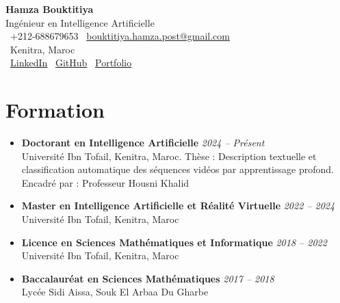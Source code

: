 \documentclass[10pt,a4paper]{article}
\newcommand{\cvheader}[4]{
    \begin{center}
        {\Huge\bfseries #1}\\[0.1em]
        {\large #2}\\[0.2em]
        \faPhone\ #3 \quad \faEnvelope\ \href{mailto:#4}{#4}\\[0.1em]
        \faMapMarker\ Kenitra, Maroc\\[0.1em]
        \faLinkedin\ \href{https://www.linkedin.com/in/hamza-bouktitiya-604471253/}{LinkedIn} \quad
        \faGithub\ \href{https://github.com/gothamza}{GitHub} \quad
        \faGlobe\ \href{https://gothamza.github.io/portfolio/}{Portfolio}
    \end{center}
    \vspace{-0.3em}
}
\newcommand{\cvitem}[2]{\textbf{#1} \hfill \textit{#2}}
\begin{document}
\cvheader{Hamza Bouktitiya}{Ingénieur en Intelligence Artificielle}{+212-688679653}{bouktitiya.hamza.post@gmail.com}

\section*{Formation}
\begin{itemize}
    \item \cvitem{Doctorant en Intelligence Artificielle}{2024 -- Présent}\\
    Université Ibn Tofail, Kenitra, Maroc. Thèse : Description textuelle et classification automatique des séquences vidéos par apprentissage profond. Encadré par : Professeur Housni Khalid
    \item \cvitem{Master en Intelligence Artificielle et Réalité Virtuelle}{2022 -- 2024}\\
    Université Ibn Tofail, Kenitra, Maroc
    \item \cvitem{Licence en Sciences Mathématiques et Informatique}{2018 -- 2022}\\
    Université Ibn Tofail, Kenitra, Maroc
    \item \cvitem{Baccalauréat en Sciences Mathématiques}{2017 -- 2018}\\
    Lycée Sidi Aissa, Souk El Arbaa Du Gharbe
\end{itemize}
\end{document}
